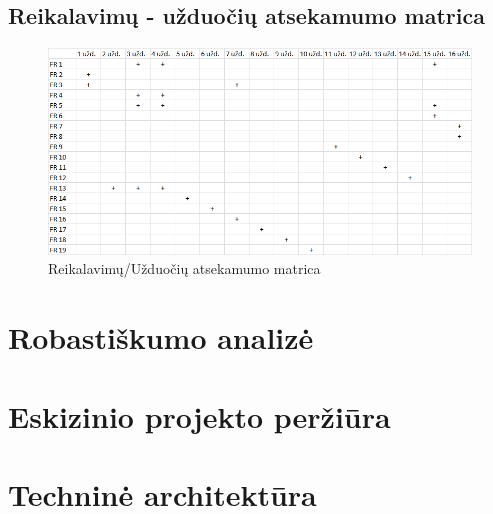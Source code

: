 \documentclass[oneside]{VUMIFPSkursinis}
\begin{document}
\subsection{Reikalavimų - užduočių atsekamumo matrica}
\begin{figure}[h]
    \centering
    \includegraphics[width=1\textwidth]{reik_uzd_matrica_before.png}
    \caption{Reikalavimų/Užduočių atsekamumo matrica}
    \label{fig:matrica}
\end{figure}

\section{Robastiškumo analizė}

\section{Eskizinio projekto peržiūra}

\section{Techninė architektūra}
\end{document}

